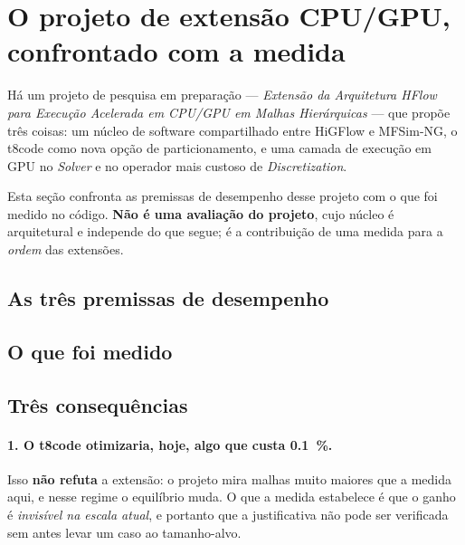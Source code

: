 \section{O projeto de extens\~ao CPU/GPU, confrontado com a medida}
\label{sec:projeto}

H\'a um projeto de pesquisa em prepara\c{c}\~ao --- \emph{Extens\~ao da
Arquitetura HFlow para Execu\c{c}\~ao Acelerada em CPU/GPU em Malhas
Hier\'arquicas} --- que prop\~oe tr\^es coisas: um n\'ucleo de software
compartilhado entre HiGFlow e MFSim-NG, o t8code como nova op\c{c}\~ao de
particionamento, e uma camada de execu\c{c}\~ao em GPU no \emph{Solver} e no
operador mais custoso de \emph{Discretization}.

Esta se\c{c}\~ao confronta as premissas de desempenho desse projeto com o que
foi medido no c\'odigo. \textbf{N\~ao \'e uma avalia\c{c}\~ao do projeto}, cujo
n\'ucleo \'e arquitetural e independe do que segue; \'e a contribui\c{c}\~ao de
uma medida para a \emph{ordem} das extens\~oes.

\subsection{As tr\^es premissas de desempenho}


\subsection{O que foi medido}


\subsection{Tr\^es consequ\^encias}

\paragraph{1. O t8code otimizaria, hoje, algo que custa \SI{0.1}{\percent}.}
Isso \textbf{n\~ao refuta} a extens\~ao: o projeto mira malhas muito maiores que
a medida aqui, e nesse regime o equil\'ibrio muda. O que a medida estabelece \'e
que o ganho \'e \emph{invis\'ivel na escala atual}, e portanto que a
justificativa n\~ao pode ser verificada sem antes levar um caso ao tamanho-alvo.

